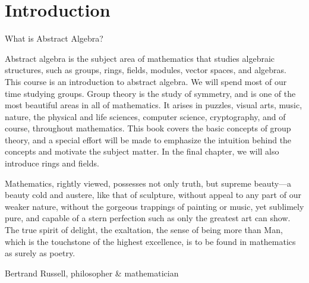 \chapter{Introduction}


\begin{section}{What is Abstract Algebra?}

Abstract algebra is the subject area of mathematics that studies algebraic structures, such as groups, rings, fields, modules, vector spaces, and algebras. This course is an introduction to abstract algebra. We will spend most of our time studying groups. Group theory is the study of symmetry, and is one of the most beautiful areas in all of mathematics. It arises in puzzles, visual arts, music, nature, the physical and life sciences, computer science, cryptography, and of course, throughout mathematics. This book covers the basic concepts of group theory, and a special effort will be made to emphasize the intuition behind the concepts and motivate the subject matter.  In the final chapter, we will also introduce rings and fields.

\epigraph{Mathematics, rightly viewed, possesses not only truth, but supreme beauty---a beauty cold and austere, like that of sculpture, without appeal to any part of our weaker nature, without the gorgeous trappings of painting or music, yet sublimely pure, and capable of a stern perfection such as only the greatest art can show. The true spirit of delight, the exaltation, the sense of being more than Man, which is the touchstone of the highest excellence, is to be found in mathematics as surely as poetry.}{Bertrand Russell, philosopher \& mathematician}

\end{section}

